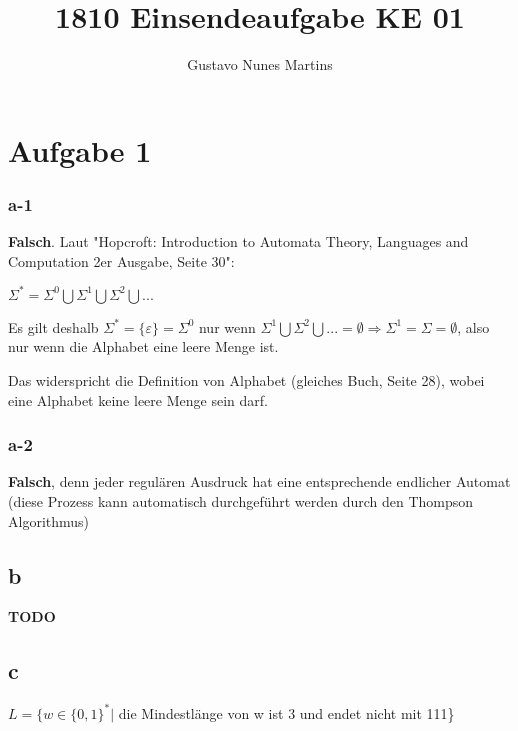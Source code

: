 \documentclass[11pt]{scrartcl}
\title{\textbf{1810 Einsendeaufgabe KE 01}}
\author{Gustavo Nunes Martins}
\begin{document}
	\maketitle
	\section*{Aufgabe 1}
	\subsubsection*{a-1}
	\textbf{Falsch}. Laut "Hopcroft: Introduction to Automata Theory, Languages and Computation 2er Ausgabe, Seite 30":
	
	\begin{center}
		$\varSigma^{*}=\varSigma^{0}\bigcup\varSigma^{1}\bigcup\varSigma^{2}\bigcup...$
	\end{center}
	
	Es gilt deshalb $\varSigma^{*}=\{\varepsilon\}=\varSigma^{0}$ nur wenn $\varSigma^{1}\bigcup\varSigma^{2}\bigcup...=\emptyset\Rightarrow\varSigma^{1}=\varSigma=\emptyset$, also nur wenn die Alphabet eine leere Menge ist. 
	
	Das widerspricht die Definition von Alphabet (gleiches Buch, Seite 28), wobei eine Alphabet keine leere Menge sein darf.
	\subsubsection*{a-2}
	\textbf{Falsch}, denn jeder regulären Ausdruck hat eine entsprechende endlicher Automat (diese Prozess kann automatisch durchgeführt werden durch den Thompson Algorithmus)
	\subsection*{b}
	\textbf{TODO}
	\subsection*{c}
	$L=\{w\in\{0,1\}^{*}|$ die Mindestlänge von w ist 3 und endet nicht mit 111\}
\end{document}
